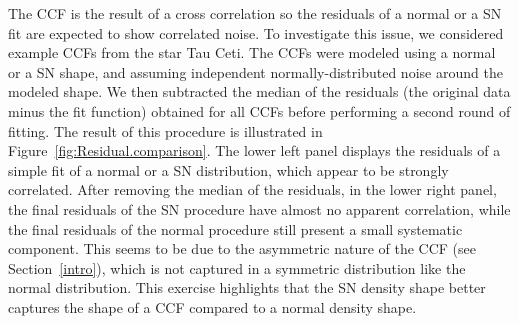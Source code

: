 \documentclass[11pt, oneside]{article}
\begin{document}
The CCF is the result of a cross correlation so the residuals of a normal or a SN fit are expected to show correlated noise.
To investigate this issue, we considered example CCFs from the star Tau Ceti.  The CCFs were modeled using a normal or a SN shape, and assuming independent normally-distributed noise around the modeled shape. 
%
We then subtracted the median of the residuals (the original data minus the fit function) obtained for all CCFs before performing a second round of fitting. The result of this procedure is illustrated in Figure~\ref{fig:Residual.comparison}. The lower left panel displays the residuals of a simple fit of a normal or a SN distribution, which appear to be strongly correlated. 
%
After removing the median of the residuals, in the lower right panel, the final residuals of the SN procedure have almost no apparent correlation, while the final residuals of the normal procedure still present a small systematic component. This seems to be due to the asymmetric nature of the CCF (see Section~\ref{intro}), which is not captured in a symmetric distribution like the normal distribution.  This exercise highlights that the SN density shape better captures the shape of a CCF compared to a normal density shape.
%
\end{document}
